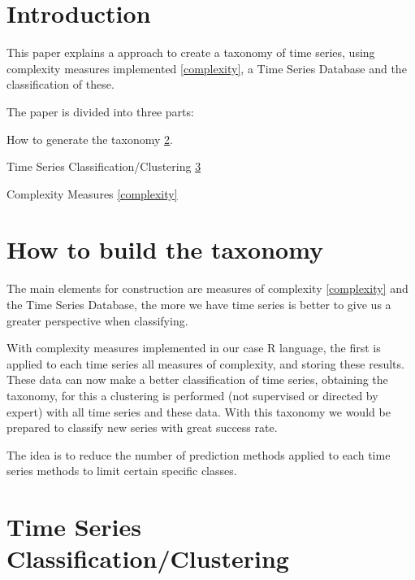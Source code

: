 \documentclass[twoside, english]{article}
\begin{document}
\begin{multicols}{2} %

\section{Introduction}

This paper explains a approach to create a taxonomy of time series, using complexity measures implemented \ref{complexity}, a Time Series Database and the classification of these.

The paper is divided into three parts:
\begin{compactitem}
\item How to generate the taxonomy \ref{taxonomy}. 
\item Time Series Classification/Clustering \ref{classification_clustering}
\item Complexity Measures \ref{complexity}
\end{compactitem}


\section{How to build the taxonomy} \label{taxonomy}

The main elements for construction are measures of complexity \ref{complexity} and the Time Series Database, the more we have time series is better to give us a greater perspective when classifying. 

With complexity measures implemented in our case R language, the first is applied to each time series all measures of complexity, and storing these results. These data can now make a better classification of time series, obtaining the taxonomy, for this a clustering is performed (not supervised or directed by expert) with all time series and these data. With this taxonomy we would be prepared to classify new series with great success rate.

The idea is to reduce the number of prediction methods applied to each time series methods to limit certain specific classes.


\section{Time Series Classification/Clustering} \label{classification_clustering}


\end{multicols}
\end{document}
